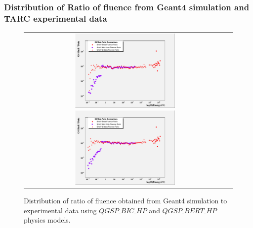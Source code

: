 \documentclass{beamer}
\begin{document}
    \begin{frame}
        \frametitle{Distribution of Ratio of fluence from Geant4 simulation and TARC experimental data}
        \begin{figure}
            \begin{tabular}{cc}
                \includegraphics[height=40mm,width=55mm]{../PICS/fluenceRatioBIC.png}\label{fig:flRatBIC}
                \includegraphics[height=40mm,width=55mm]{../PICS/fluenceRatioBERT.png}\label{fig:flRatBERT}
            \end{tabular}
        \caption{Distribution of ratio of fluence obtained from Geant4 simulation to experimental data using $QGSP\_BIC\_HP$ and $QGSP\_BERT\_HP$ physics models.}
        \end{figure}
    \end{frame}
\end{document}
